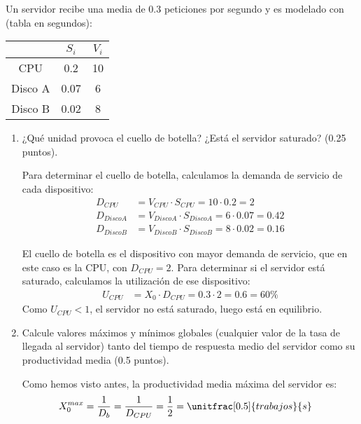 \documentclass[12pt]{article}
\begin{document}
    \begin{ejercicio}[2 puntos]
        Un servidor recibe una media de $0.3$ peticiones por segundo y es modelado con (tabla en segundos):
        \begin{table}[H]
        \centering
        \begin{tabular}{c|c|c}
            & $S_i$ & $V_i$ \\
            \hline
            CPU & 0.2 & 10 \\
            Disco A & 0.07 & 6 \\
            Disco B & 0.02 & 8
        \end{tabular}
        \end{table}

        \begin{enumerate}
            \item ¿Qué unidad provoca el cuello de botella? ¿Está el servidor saturado? (0.25 puntos).
            
            Para determinar el cuello de botella, calculamos la demanda de servicio de cada dispositivo:
            \begin{align*}
                D_{CPU} &= V_{CPU}\cdot S_{CPU} = 10\cdot 0.2 = 2\\
                D_{Disco A} &= V_{Disco A}\cdot S_{Disco A} = 6\cdot 0.07 = 0.42\\
                D_{Disco B} &= V_{Disco B}\cdot S_{Disco B} = 8\cdot 0.02 = 0.16
            \end{align*}

            El cuello de botella es el dispositivo con mayor demanda de servicio, que en este caso es la CPU, con $D_{CPU} = 2$.
            Para determinar si el servidor está saturado, calculamos la utilización de ese dispositivo:
            \begin{align*}
                U_{CPU} &= X_0\cdot D_{CPU} = 0.3\cdot 2 = 0.6 = 60\%
            \end{align*}
            Como $U_{CPU} < 1$, el servidor no está saturado, luego está en equilibrio.
            \item Calcule valores máximos y mínimos globales (cualquier valor de la tasa de llegada al servidor) tanto del tiempo de respuesta medio del servidor como su productividad media (0.5 puntos).
            
            Como hemos visto antes, la productividad media máxima del servidor es:
            \begin{align*}
                X_0^{max} &= \frac{1}{D_b} = \frac{1}{D_{CPU}} = \frac{1}{2} = \unitfrac[0.5]{trabajos}{s}
            \end{align*}


\end{enumerate}
\end{ejercicio}
\end{document}
